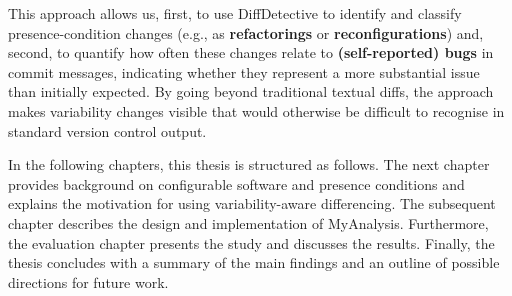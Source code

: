 This approach allows us, first, to use DiffDetective to identify and classify presence-condition changes (e.g., as \textbf{refactorings} or \textbf{reconfigurations}) and, second, to quantify how often these changes relate to \textbf{(self-reported) bugs} in commit messages, indicating whether they represent a more substantial issue than initially expected. By going beyond traditional textual diffs, the approach makes variability changes visible that would otherwise be difficult to recognise in standard version control output.

In the following chapters, this thesis is structured as follows. The next chapter provides background on configurable software and presence conditions and explains the motivation for using variability-aware differencing. The subsequent chapter describes the design and implementation of MyAnalysis. Furthermore, the evaluation chapter presents the study and discusses the results. Finally, the thesis concludes with a summary of the main findings and an outline of possible directions for future work.



